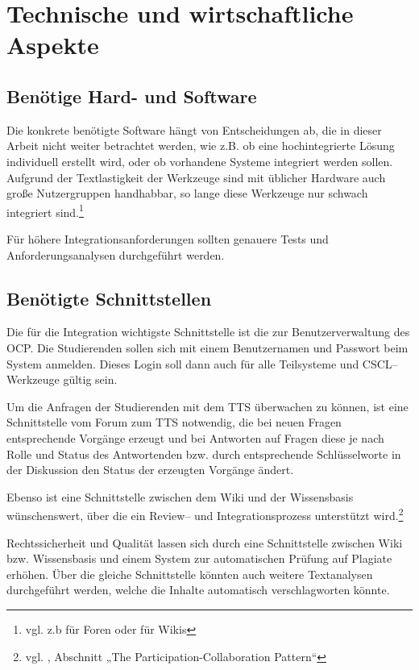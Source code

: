 \section{Technische und wirtschaftliche Aspekte} %
\label{sec:technische_und_wirtschaftliche_aspekte}

\subsection{Benötige Hard- und Software} %
\label{sub:benotige_hard_und_software}
Die konkrete benötigte Software hängt von Entscheidungen ab, die in dieser Arbeit nicht weiter betrachtet werden, wie z.B. ob eine hochintegrierte Lösung individuell erstellt wird, oder ob vorhandene Systeme integriert werden sollen. Aufgrund der Textlastigkeit der Werkzeuge sind mit üblicher Hardware auch große Nutzergruppen handhabbar, so lange diese Werkzeuge nur schwach integriert sind.\footnote{vgl. z.b \cite{phpbblarge} für Foren oder \cite{dwlarge} für Wikis}

Für höhere Integrationsanforderungen sollten genauere Tests und Anforderungsanalysen durchgeführt werden.

\subsection{Benötigte Schnittstellen} %
\label{sub:benotigte_schnittstellen}
Die für die Integration wichtigste Schnittstelle ist die zur Benutzerverwaltung des \ac{OCP}. Die Studierenden sollen sich mit einem Benutzernamen und Passwort beim System anmelden. Dieses Login soll dann auch für alle Teilsysteme und CSCL–Werkzeuge gültig sein.

Um die Anfragen der Studierenden mit dem \ac{TTS} überwachen zu können, ist eine Schnittstelle vom Forum zum \ac{TTS} notwendig, die bei neuen Fragen entsprechende Vorgänge erzeugt und bei Antworten auf Fragen diese je nach Rolle und Status des Antwortenden bzw. durch entsprechende Schlüsselworte in der Diskussion den Status der erzeugten Vorgänge ändert.

Ebenso ist eine Schnittstelle zwischen dem Wiki und der Wissensbasis wünschenswert, über die ein Review-- und Integrationsprozess unterstützt wird.\footnote{vgl. \cite{governor}, Abschnitt „The Participation-Collaboration Pattern“}

Rechtssicherheit und Qualität lassen sich durch eine Schnittstelle zwischen Wiki bzw. Wissensbasis und einem System zur automatischen Prüfung auf Plagiate erhöhen. Über die gleiche Schnittstelle könnten auch weitere Textanalysen durchgeführt werden, welche die Inhalte automatisch verschlagworten könnte.

